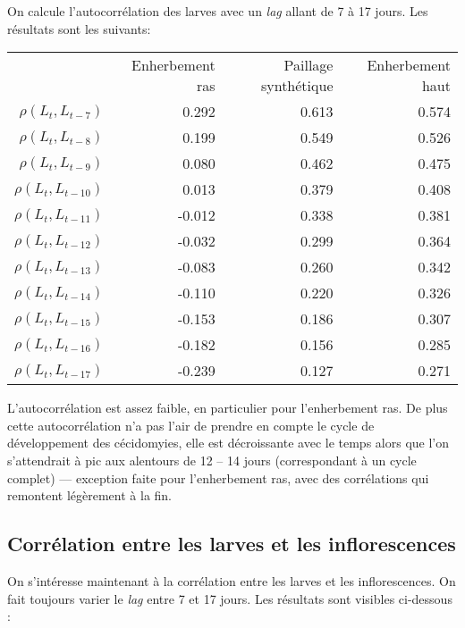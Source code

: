 \documentclass[a4paper, 11pt]{article}
\begin{document}
On calcule l'autocorrélation des larves avec un \emph{lag} allant de 7 à 17 jours. Les résultats sont les suivants:

\begin{center}
\begin{tabular}{rrrr}
 & Enherbement ras & Paillage synthétique & Enherbement haut \\
$\rho\left( L_t, L_{t-7} \right)    $ &  0.292 & 0.613 & 0.574\\
$\rho\left( L_t, L_{t-8} \right)    $&  0.199 &  0.549 & 0.526 \\
$\rho\left( L_t, L_{t-9} \right)    $&  0.080&   0.462 & 0.475\\
$\rho\left( L_t, L_{t-10} \right)    $&  0.013&  0.379 & 0.408 \\
$\rho\left( L_t, L_{t-11} \right)    $& -0.012 & 0.338 & 0.381 \\
$\rho\left( L_t, L_{t-12} \right)    $& -0.032 & 0.299 & 0.364     \\
$\rho\left( L_t, L_{t-13} \right)    $& -0.083 & 0.260 & 0.342    \\
$\rho\left( L_t, L_{t-14} \right)    $& -0.110 & 0.220 & 0.326         \\
$\rho\left( L_t, L_{t-15} \right)    $& -0.153 & 0.186 & 0.307          \\
$\rho\left( L_t, L_{t-16} \right)    $& -0.182 & 0.156 & 0.285           \\
$\rho\left( L_t, L_{t-17} \right)    $& -0.239 & 0.127 & 0.271             
\end{tabular}
\end{center}

L'autocorrélation est assez faible, en particulier pour l'enherbement ras. De plus cette autocorrélation n'a pas l'air de prendre en compte le cycle de développement des cécidomyies, elle est décroissante avec le temps alors que l'on s'attendrait à pic aux alentours de 12 -- 14 jours (correspondant à un cycle complet) --- exception faite pour l'enherbement ras, avec des corrélations qui remontent légèrement à la fin. 

\subsection{Corrélation entre les larves et les inflorescences}

On s'intéresse maintenant à la corrélation entre les larves et les inflorescences. On fait toujours varier le \emph{lag} entre 7 et 17 jours. Les résultats sont visibles ci-dessous :
\end{document}
